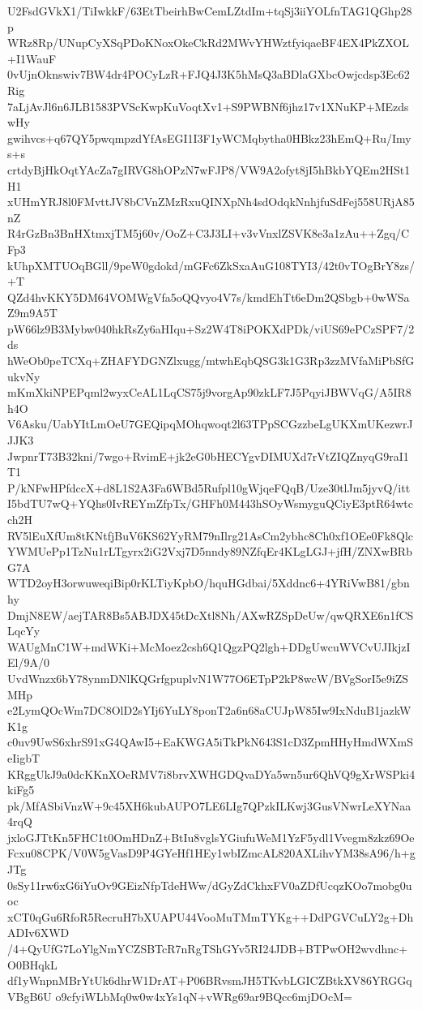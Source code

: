 U2FsdGVkX1/TiIwkkF/63EtTbeirhBwCemLZtdIm+tqSj3iiYOLfnTAG1QGhp28p
WRz8Rp/UNupCyXSqPDoKNoxOkeCkRd2MWvYHWztfyiqaeBF4EX4PkZXOL+I1WauF
0vUjnOknswiv7BW4dr4POCyLzR+FJQ4J3K5hMsQ3aBDlaGXbcOwjcdsp3Ec62Rig
7aLjAvJl6n6JLB1583PVScKwpKuVoqtXv1+S9PWBNf6jhz17v1XNuKP+MEzdswHy
gwihvcs+q67QY5pwqmpzdYfAsEGI1I3F1yWCMqbytha0HBkz23hEmQ+Ru/Imys+s
crtdyBjHkOqtYAcZa7gIRVG8hOPzN7wFJP8/VW9A2ofyt8jI5hBkbYQEm2HSt1H1
xUHmYRJ8l0FMvttJV8bCVnZMzRxuQINXpNh4sdOdqkNnhjfuSdFej558URjA85nZ
R4rGzBn3BnHXtmxjTM5j60v/OoZ+C3J3LI+v3vVnxlZSVK8e3a1zAu++Zgq/CFp3
kUhpXMTUOqBGll/9peW0gdokd/mGFc6ZkSxaAuG108TYI3/42t0vTOgBrY8zs/+T
QZd4hvKKY5DM64VOMWgVfa5oQQvyo4V7s/kmdEhTt6eDm2QSbgb+0wWSaZ9m9A5T
pW66lz9B3Mybw040hkRsZy6aHIqu+Sz2W4T8iPOKXdPDk/viUS69ePCzSPF7/2ds
hWeOb0peTCXq+ZHAFYDGNZlxugg/mtwhEqbQSG3k1G3Rp3zzMVfaMiPbSfGukvNy
mKmXkiNPEPqml2wyxCeAL1LqCS75j9vorgAp90zkLF7J5PqyiJBWVqG/A5IR8h4O
V6Asku/UabYItLmOeU7GEQipqMOhqwoqt2l63TPpSCGzzbeLgUKXmUKezwrJJJK3
JwpnrT73B32kni/7wgo+RvimE+jk2eG0bHECYgvDIMUXd7rVtZIQZnyqG9raI1T1
P/kNFwHPfdccX+d8L1S2A3Fa6WBd5Rufpl10gWjqeFQqB/Uze30tlJm5jyvQ/itt
I5bdTU7wQ+YQhs0IvREYmZfpTx/GHFh0M443hSOyWsmyguQCiyE3ptR64wtcch2H
RV5lEuXfUm8tKNtfjBuV6KS62YyRM79nIlrg21AsCm2ybhc8Ch0xf1OEe0Fk8Qlc
YWMUePp1TzNu1rLTgyrx2iG2Vxj7D5nndy89NZfqEr4KLgLGJ+jfH/ZNXwBRbG7A
WTD2oyH3orwuweqiBip0rKLTiyKpbO/hquHGdbai/5Xddnc6+4YRiVwB81/gbnhy
DmjN8EW/aejTAR8Bs5ABJDX45tDcXtl8Nh/AXwRZSpDeUw/qwQRXE6n1fCSLqcYy
WAUgMnC1W+mdWKi+McMoez2csh6Q1QgzPQ2lgh+DDgUwcuWVCvUJIkjzIEl/9A/0
UvdWnzx6bY78ynmDNlKQGrfgpuplvN1W77O6ETpP2kP8wcW/BVgSorI5e9iZSMHp
e2LymQOcWm7DC8OlD2sYIj6YuLY8ponT2a6n68aCUJpW85Iw9IxNduB1jazkWK1g
c0uv9UwS6xhrS91xG4QAwI5+EaKWGA5iTkPkN643S1cD3ZpmHHyHmdWXmSeIigbT
KRggUkJ9a0dcKKnXOeRMV7i8brvXWHGDQvaDYa5wn5ur6QhVQ9gXrWSPki4kiFg5
pk/MfASbiVnzW+9c45XH6kubAUPO7LE6LIg7QPzkILKwj3GusVNwrLeXYNaa4rqQ
jxloGJTtKn5FHC1t0OmHDnZ+BtIu8vglsYGiufuWeM1YzF5ydl1Vvegm8zkz69Oe
Fcxu08CPK/V0W5gVasD9P4GYeHf1HEy1wbIZmcAL820AXLihvYM38sA96/h+gJTg
0sSy11rw6xG6iYuOv9GEizNfpTdeHWw/dGyZdCkhxFV0aZDfUcqzKOo7mobg0uoc
xCT0qGu6RfoR5RecruH7bXUAPU44VooMuTMmTYKg++DdPGVCuLY2g+DhADIv6XWD
/4+QyUfG7LoYlgNmYCZSBTcR7nRgTShGYv5RI24JDB+BTPwOH2wvdhnc+O0BHqkL
df1yWnpnMBrYtUk6dhrW1DrAT+P06BRvsmJH5TKvbLGICZBtkXV86YRGGqVBgB6U
o9cfyiWLbMq0w0w4xYs1qN+vWRg69ar9BQcc6mjDOcM=
